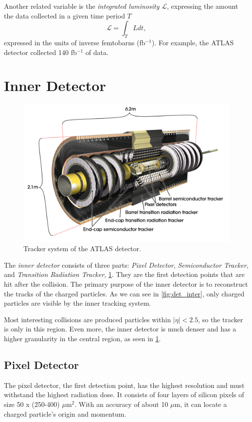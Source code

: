 Another related variable is the \emph{integrated luminosity} $ \mathcal{L}$, expressing the amount the data collected in a given time period $T$
\begin{equation}
    \mathcal{L} = \int_{T} L dt,
\end{equation}
expressed in the units of inverse femtobarns (fb$^{-1}$).
For example, the ATLAS detector collected 140 fb$^{-1}$ of data.




\section{Inner Detector}
\label{sec:trackers}
\begin{figure}[htb]
    \centering
    \includegraphics[width=1\linewidth]{src/img/track.jpg}
    \caption{Tracker system of the ATLAS detector.}
    \label{fig:tracker}
\end{figure}
The \emph{inner detector} consists of three parts: \emph{Pixel Detector}, \emph{Semiconductor Tracker}, and \emph{Transition Radiation Tracker}, \cref{fig:tracker}. 
They are the first detection points that are hit after the collision.
The primary purpose of the inner detector is to reconstruct the tracks of the charged particles.
As we can see in \cref{fig:det_inter}, only charged particles are visible by the inner tracking system.

Most interesting collisions are produced particles within $|\eta| < 2.5$, so the tracker is only in this region.
Even more, the inner detector is much denser and has a higher granularity in the central region, as seen in \cref{fig:tracker}.

\subsection{Pixel Detector}
The pixel detector, the first detection point, has the highest resolution and must withstand the highest radiation dose.
It consists of four layers of silicon pixels of size 50 x (250-400) $\mu$m$^2$.
With an accuracy of about 10 $\mu$m, it can locate a charged particle's origin and momentum.

